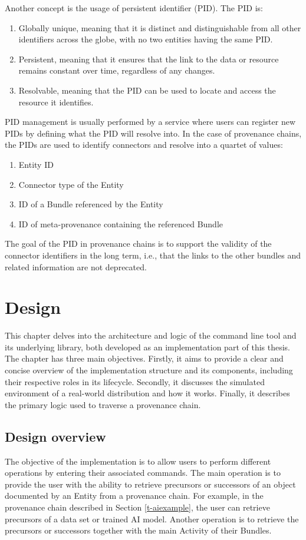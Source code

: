 \documentclass[
  digital,     %
  oneside,     %
  nosansbold,  %
  nocolorbold, %
  lof,         %
  lot,         %
]{fithesis4}
\begin{document}
Another concept is the usage of persistent identifier (PID). 
The PID is:

\begin{enumerate}
    \item Globally unique, meaning that it is distinct and distinguishable from all other identifiers across the globe, with no two entities having the same PID.
    \item Persistent, meaning that it ensures that the link to the data or resource remains constant over time, regardless of any changes.
    \item Resolvable, meaning that the PID can be used to locate and access the resource it identifies.
\end{enumerate}

PID management is usually performed by a service where users can register new PIDs by defining what the PID will resolve into. In the case of provenance chains, the PIDs are used to identify connectors and resolve into a quartet of values:

\begin{enumerate}
    \item Entity ID
    \item Connector type of the Entity
    \item ID of a Bundle referenced by the Entity
    \item ID of meta-provenance containing the referenced Bundle
\end{enumerate}

The goal of the PID in provenance chains is to support the validity of the connector identifiers in the long term, i.e., that the links to the other bundles and related information are not deprecated. 


\chapter{Design}
\shorthandoff{-}
This chapter delves into the architecture and logic of the command line tool and its underlying library, both developed as an implementation part of this thesis. The chapter has three main objectives. Firstly, it aims to provide a clear and concise overview of the implementation structure and its components, including their respective roles in its lifecycle. Secondly, it discusses the simulated environment of a real-world distribution and how it works. Finally, it describes the primary logic used to traverse a provenance chain.
\shorthandon{-}

\section{Design overview}
The objective of the implementation is to allow users to perform different operations by entering their associated commands. The main operation is to provide the user with the ability to retrieve precursors or successors of an object documented by an Entity from a provenance chain. For example, in the provenance chain described in Section \ref{t-aiexample}, the user can retrieve precursors of a data set or trained AI model. Another operation is to retrieve the precursors or successors together with the main Activity of their Bundles.
\end{document}
